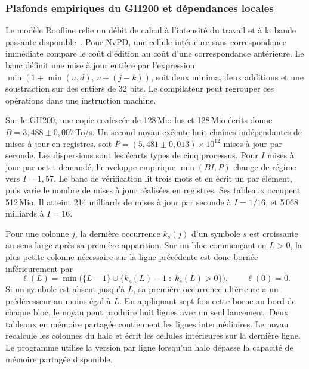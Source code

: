 \subsubsection{Plafonds empiriques du GH200 et dépendances locales}\label{sec:roofline-gpu}
Le modèle Roofline relie un débit de calcul à l'intensité du travail et à la bande passante disponible~\cite{roofline}. Pour NvPD, une cellule intérieure sans correspondance immédiate compare le coût d'édition au coût d'une correspondance antérieure. Le banc définit une mise à jour entière par l'expression \(\min(1+\min(u,d),\,v+(j-k))\), soit deux minima, deux additions et une soustraction sur des entiers de 32 bits. Le compilateur peut regrouper ces opérations dans une instruction machine.

Sur le GH200, une copie coalescée de 128\,Mio lus et 128\,Mio écrits donne \(B=3{,}488\pm0{,}007\)\,To/s. Un second noyau exécute huit chaînes indépendantes de mises à jour en registres, soit \(P=(5{,}481\pm0{,}013)\times10^{12}\) mises à jour par seconde. Les dispersions sont les écarts types de cinq processus. Pour \(I\) mises à jour par octet demandé, l'enveloppe empirique \(\min(BI,P)\) change de régime vers \(I=1{,}57\). Le banc de vérification lit trois mots et en écrit un par élément, puis varie le nombre de mises à jour réalisées en registres. Ses tableaux occupent 512\,Mio. Il atteint 214 milliards de mises à jour par seconde à \(I=1/16\), et 5\,068 milliards à \(I=16\).

Pour une colonne \(j\), la dernière occurrence \(k_s(j)\) d'un symbole \(s\) est croissante au sens large après sa première apparition. Sur un bloc commençant en \(L>0\), la plus petite colonne nécessaire sur la ligne précédente est donc bornée inférieurement par
\[
  \ell(L)=\min\bigl(\{L-1\}\cup\{k_s(L)-1\;:\;k_s(L)>0\}\bigr),\qquad \ell(0)=0.
\]
Si un symbole est absent jusqu'à \(L\), sa première occurrence ultérieure a un prédécesseur au moins égal à \(L\). En appliquant sept fois cette borne au bord de chaque bloc, le noyau peut produire huit lignes avec un seul lancement. Deux tableaux en mémoire partagée contiennent les lignes intermédiaires. Le noyau recalcule les colonnes du halo et écrit les cellules intérieures sur la dernière ligne. Le programme utilise la version par ligne lorsqu'un halo dépasse la capacité de mémoire partagée disponible.


